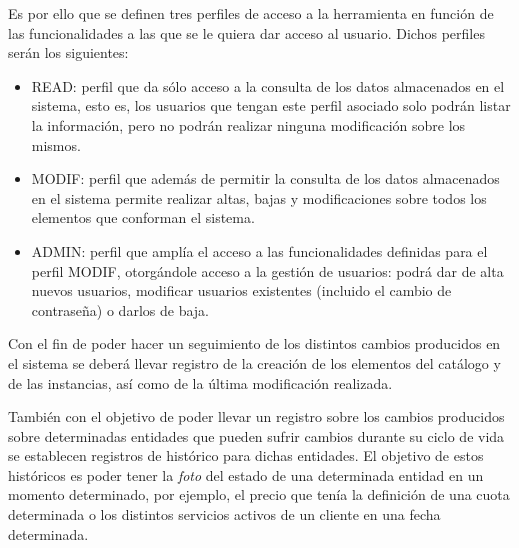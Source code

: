 Es por ello que se definen tres perfiles de acceso a la herramienta en función de las funcionalidades a las que se le quiera dar acceso al usuario. Dichos perfiles serán los siguientes:
\begin{itemize}
\item READ: perfil que da sólo acceso a la consulta de los datos almacenados en el sistema, esto es, los usuarios que tengan este perfil asociado solo podrán listar la información, pero no podrán realizar ninguna modificación sobre los mismos.
\item MODIF: perfil que además de permitir la consulta de los datos almacenados en el sistema permite realizar altas, bajas y modificaciones sobre todos los elementos que conforman el sistema.
\item ADMIN: perfil que amplía el acceso a las funcionalidades definidas para el perfil MODIF, otorgándole acceso a la gestión de usuarios: podrá dar de alta nuevos usuarios, modificar usuarios existentes (incluido el cambio de contraseña) o darlos de baja.
\end{itemize}


Con el fin de poder hacer un seguimiento de los distintos cambios producidos en el sistema se deberá llevar registro de la creación de los elementos  del catálogo y de las instancias, así como de la última modificación realizada.

También con el objetivo de poder llevar un registro sobre los cambios producidos sobre determinadas entidades que pueden sufrir cambios durante su ciclo de vida se establecen registros de histórico para dichas entidades. El objetivo de estos históricos es poder tener la \textit{foto} del estado de una determinada entidad en un momento determinado, por ejemplo, el precio que tenía la definición de una cuota determinada o los distintos servicios activos de un cliente en una fecha determinada.



